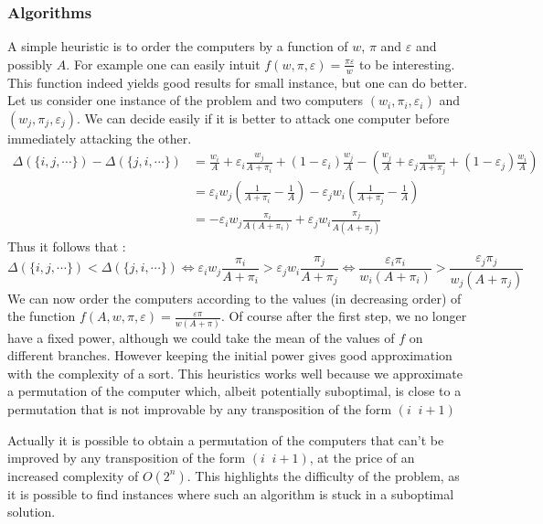 \documentclass[11pt]{llncs}
\begin{document}
		\subsubsection{Algorithms}		
		A simple heuristic is to order the computers by a function of $w$, $\pi$ and $\varepsilon$ and possibly $A$. For example one can easily intuit $f(w, \pi, \varepsilon) = \frac{\pi\varepsilon}{w}$ to be interesting. This function indeed yields good results for small instance, but one can do better.
		Let us consider one instance of the problem and two computers $(w_i,\pi_i,\varepsilon_i)$ and $(w_j,\pi_j,\varepsilon_j)$. We can decide easily if it is better to attack one computer before immediately attacking the other.
		\begin{align*}
			\Delta( \{ i, j, \cdots \}) - 	\Delta( \{ j, i, \cdots \}) &=  \frac{w_i}{A} + \varepsilon_i \frac{w_j}{A + \pi_i} + (1 - \varepsilon_i) \frac{w_j}{A} - \left ( \frac{w_j}{A} + \varepsilon_j \frac{w_i}{A + \pi_j} + (1 - \varepsilon_j ) \frac{w_i}{A} \right ) \\
										&=   \varepsilon_i w_j \left ( \frac{1}{A + \pi_i} -\frac{1}{A} \right ) - \varepsilon_j w_i \left ( \frac{1}{A + \pi_j} -\frac{1}{A} \right )\\ 
										&= - \varepsilon_i w_j  \frac{\pi_i}{A(A + \pi_i )} + \varepsilon_j w_i  \frac{\pi_j}{A(A + \pi_j )} 
		\end{align*}
		Thus it follows that : \[ \Delta( \{ i, j, \cdots \}) < \Delta( \{ j, i, \cdots \}) \Leftrightarrow \varepsilon_i w_j  \frac{\pi_i}{A + \pi_i} > \varepsilon_j w_i  \frac{\pi_j}{A + \pi_j} \Leftrightarrow \frac{\varepsilon_i \pi_i}{w_i(A + \pi_i)} >  \frac{\varepsilon_j \pi_j}{w_j(A + \pi_j)} \]
		We can now order the computers according to the values (in decreasing order) of the function $f(A,w,\pi, \varepsilon) =\frac{\varepsilon \pi}{w(A + \pi)}$. Of course after the first step, we no longer have a fixed power, although we could take the mean of the values of $f$ on different branches. However keeping the initial power gives good approximation with the complexity of a sort.
		This heuristics works well because we approximate a permutation of the computer which, albeit potentially suboptimal, is close to a permutation that is not improvable by any transposition of the form $(i\;\; i+1)$
		

		Actually it is possible to obtain a permutation of the computers that can't be improved by any transposition of the form  $(i\;\; i+1)$, at the price of an increased complexity of $O(2^n)$. This highlights the difficulty of the problem, as it is possible to find instances where such an algorithm is stuck in a suboptimal solution.
		
\end{document}
